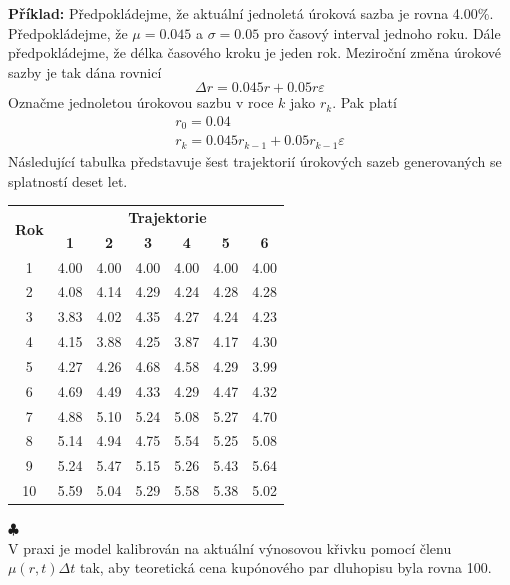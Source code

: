 \documentclass[a4paper]{book}
\begin{document}
\noindent \textbf{Příklad:} Předpokládejme, že aktuální jednoletá úroková sazba je rovna 4.00\%. Předpokládejme, že $\mu = 0.045$ a $\sigma = 0.05$ pro časový interval jednoho roku. Dále předpokládejme, že délka časového kroku je jeden rok. Meziroční změna úrokové sazby je tak dána rovnicí
\begin{equation*}
\Delta r = 0.045 r + 0.05 r \varepsilon
\end{equation*}
Označme jednoletou úrokovou sazbu v roce $k$ jako $r_k$. Pak platí
\begin{gather*}
r_0 = 0.04 \\
r_k = 0.045 r_{k-1} + 0.05 r_{k-1} \varepsilon
\end{gather*}
Následující tabulka představuje šest trajektorií úrokových sazeb generovaných se splatností deset let.
\begin{center}
\begin{tabular}{c c c c c c c}
\multirow{2}{*}{\textbf{Rok}} & \multicolumn{6}{c}{\textbf{Trajektorie}} \\
 & \textbf{1} & \textbf{2} & \textbf{3} & \textbf{4} & \textbf{5} & \textbf{6} \\
\hline
1  & 4.00 & 4.00 & 4.00 & 4.00 & 4.00 & 4.00 \\
2  & 4.08 & 4.14 & 4.29 & 4.24 & 4.28 & 4.28 \\
3  & 3.83 & 4.02 & 4.35 & 4.27 & 4.24 & 4.23 \\
4  & 4.15 & 3.88 & 4.25 & 3.87 & 4.17 & 4.30 \\
5  & 4.27 & 4.26 & 4.68 & 4.58 & 4.29 & 3.99 \\
6  & 4.69 & 4.49 & 4.33 & 4.29 & 4.47 & 4.32 \\
7  & 4.88 & 5.10 & 5.24 & 5.08 & 5.27 & 4.70 \\
8  & 5.14 & 4.94 & 4.75 & 5.54 & 5.25 & 5.08 \\
9  & 5.24 & 5.47 & 5.15 & 5.26 & 5.43 & 5.64 \\
10 & 5.59 & 5.04 & 5.29 & 5.58 & 5.38 & 5.02 \\
\end{tabular}
\end{center}
$\clubsuit$\\

V praxi je model kalibrován na aktuální výnosovou křivku pomocí členu $\mu(r,t) \Delta t$ tak, aby teoretická cena kupónového par dluhopisu byla rovna 100.
\end{document}

